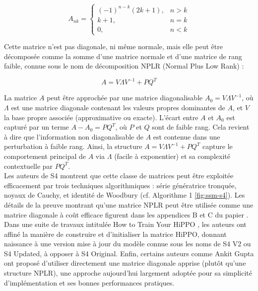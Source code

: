 \begin{equation}
A_{nk} = \begin{cases}
(-1)^{n-k} (2k+1), & n > k \\
k + 1, & n = k \\
0, & n < k
\end{cases}
\end{equation}

Cette matrice n’est pas diagonale, ni même normale, mais elle peut être décomposée comme la somme d’une matrice normale et d’une matrice de rang faible, connue sous le nom de décomposition NPLR (Normal Plus Low Rank) :

\begin{equation}
A = V \Lambda V^{-1} + P Q^T
\end{equation}

La matrice $A$ peut être approchée par une matrice diagonalisable $A_0 = V \Lambda V^{-1}$, où $\Lambda$ est une matrice diagonale contenant les valeurs propres dominantes de $A$, et $V$ la base propre associée (approximative ou exacte). L’écart entre $A$ et $A_0$ est capturé par un terme $A - A_0 = P Q^T$, où $P$ et $Q$ sont de faible rang. Cela revient à dire que l’information non diagonalisable de $A$ est contenue dans une perturbation à faible rang. Ainsi, la structure $A = V \Lambda V^{-1} + P Q^T$ capture le comportement principal de $A$ via $\Lambda$ (facile à exponentier) et sa complexité contextuelle par $P Q^T$.\\

Les auteurs de S4 montrent que cette classe de matrices peut être exploitée efficacement par trois techniques algorithmiques : série génératrice tronquée, noyaux de Cauchy, et identité de Woodbury (cf. Algorithme 1 \autoref{fig:ssm-s4}). Les détails de la preuve montrant qu’une matrice NPLR peut être utilisée comme une matrice diagonale à coût efficace figurent dans les appendices B et C du papier \citep{sun2023retnet}. Dans une suite de travaux intitulée How to Train Your HiPPO \citep{gu2022trainhippo}, les auteurs ont affiné la manière de construire et d’initialiser la matrice HiPPO, donnant naissance à une version mise à jour du modèle connue sous les noms de S4 V2 ou S4 Updated, à opposer à S4 Original. Enfin, certains auteurs comme Ankit Gupta ont proposé d’utiliser directement une matrice diagonale apprise (plutôt qu’une structure NPLR), une approche aujourd’hui largement adoptée pour sa simplicité d’implémentation et ses bonnes performances pratiques.\\


